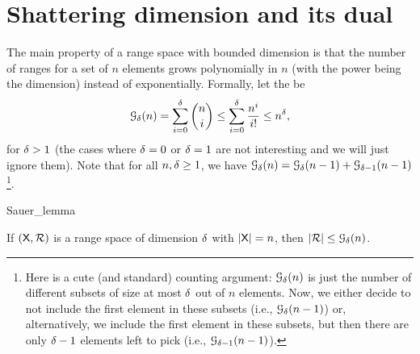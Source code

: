 \section{Shattering dimension and its dual}%

The main property of a range space with bounded \VC dimension is that
the number of ranges for a set of $n$ elements grows polynomially in
$n$ (with the power being the dimension) instead of exponentially.
Formally, let the  be
\begin{equation}
    \Growth{\Dim}{n} = \sum_{i=0}^{\Dim} \binom{n}{i}
    \leq \sum_{i=0}^{\Dim} \frac{n^i}{i!}
    \leq n^\Dim,
    \eqlab{g:d:n:estimate}
\end{equation}
for $\delta>1$ (the cases where $\delta=0$ or $\delta=1$ are not interesting
and we will just ignore them).  Note that for all $n,\delta \geq 1$, we
have $\Growth{\Dim}{n} = \Growth{\Dim}{n-1} +
\Growth{\Dim-1}{n-1}$\footnote{Here is a cute (and standard) counting
   argument: $\Growth{\Dim}{n}$ is just the number of different
   subsets of size at most $\delta$ out of $n$ elements. Now, we either
   decide to not include the first element in these subsets (i.e.,
   $\Growth{\Dim}{n-1}$) or, alternatively, we include the first
   element in these subsets, but then there are only $\delta-1$ elements
   left to pick (i.e., $\Growth{\Dim-1}{n-1}$).}.

\begin{fragment}{Sauer_lemma}
    \begin{lemma}
        If $(\textsf{X},{\mathcal{R}})$ is a range space of \VC dimension
        $\delta$ with $|\textsf{X}| = n$, then $|\RangeSet| \leq
        \Growth{\Dim}{n}$.        
    \end{lemma}
\end{fragment}

